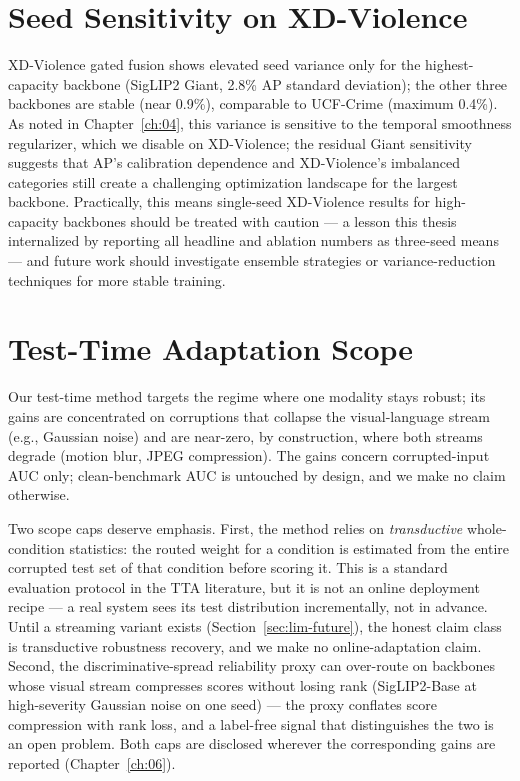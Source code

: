 \section{Seed Sensitivity on XD-Violence}
\label{sec:lim-seeds}

XD-Violence gated fusion shows elevated seed variance only for the
highest-capacity backbone (SigLIP2 Giant, 2.8\% AP standard deviation); the
other three backbones are stable (near 0.9\%), comparable to UCF-Crime
(maximum 0.4\%). As noted in Chapter~\ref{ch:04}, this variance is sensitive
to the temporal smoothness regularizer, which we disable on XD-Violence; the
residual Giant sensitivity suggests that AP's calibration dependence and
XD-Violence's imbalanced categories still create a challenging optimization
landscape for the largest backbone. Practically, this means single-seed
XD-Violence results for high-capacity backbones should be treated with
caution --- a lesson this thesis internalized by reporting all headline and
ablation numbers as three-seed means --- and future work should investigate
ensemble strategies or variance-reduction techniques for more stable training.

\section{Test-Time Adaptation Scope}
\label{sec:lim-tta}

Our test-time method targets the regime where one modality stays robust; its
gains are concentrated on corruptions that collapse the visual-language stream
(e.g., Gaussian noise) and are near-zero, by construction, where both streams
degrade (motion blur, JPEG compression). The gains concern corrupted-input AUC
only; clean-benchmark AUC is untouched by design, and we make no claim
otherwise.

Two scope caps deserve emphasis. First, the method relies on
\emph{transductive} whole-condition statistics: the routed weight for a
condition is estimated from the entire corrupted test set of that condition
before scoring it. This is a standard evaluation protocol in the TTA
literature, but it is not an online deployment recipe --- a real system sees
its test distribution incrementally, not in advance. Until a streaming variant
exists (Section~\ref{sec:lim-future}), the honest claim class is transductive
robustness recovery, and we make no online-adaptation claim. Second, the
discriminative-spread reliability proxy can over-route on backbones whose
visual stream compresses scores without losing rank (SigLIP2-Base at
high-severity Gaussian noise on one seed) --- the proxy conflates score
compression with rank loss, and a label-free signal that distinguishes the two
is an open problem. Both caps are disclosed wherever the corresponding gains
are reported (Chapter~\ref{ch:06}).


